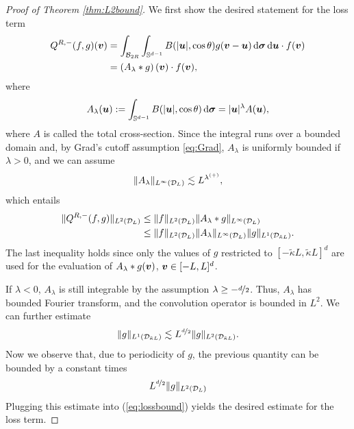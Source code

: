 \begin{proof}[Proof of Theorem \ref{thm:L2bound}]
    We first show the desired statement for the loss term
    \begin{align*}
        Q^{R,-}(f,g)({\bm v}) 
        &= \int_{\mathcal{B}_{2R}}\int_{\mathbb{S}^{d-1}}B(|{\bm u}|,\cos\theta)
            g({\bm v}-{\bm u})\,\mathrm{d}{\bm\sigma}\,\mathrm{d}{\bm u}\cdot f({\bm v}) \\
        &= \left(A_\lambda\ast g\right)({\bm v})\cdot f({\bm v}),
    \end{align*}
    where
    \[
        A_\lambda({\bm u}) := \int_{\mathbb{S}^{d-1}} B(|{\bm u}|,\cos\theta) \,\mathrm{d}{\bm\sigma} = |{\bm u}|^\lambda A({\bm u}),
    \]
    where $A$ is called the total cross-section.  Since the integral runs over a bounded domain and, by Grad's
    cutoff assumption \eqref{eq:Grad}, $A_\lambda$ is uniformly bounded if $\lambda>0$, and we can assume
    \[
        \|A_\lambda\|_{L^\infty(\mathcal{D}_L)} \lesssim L^{\lambda^{(+)}},
    \]
    which entails 
    \begin{align}
        \|Q^{R,-}(f,g)\|_{L^2(\mathcal{D}_L)} & \le \|f\|_{L^2(\mathcal{D}_L)}
                \|A_\lambda\ast g\|_{L^\infty(\mathcal{D}_L)} \\
        \label{eq:lossbound} & \le \|f\|_{L^2(\mathcal{D}_L)}
                \|A_\lambda\|_{L^\infty(\mathcal{D}_L)}\|g\|_{L^1(\mathcal{D}_{\tilde{\kappa}L})}.
    \end{align}
    The last inequality holds since only the values of $g$ restricted to
    $[-\tilde{\kappa}L,\tilde{\kappa}L]^d$ are used for the evaluation of $A_\lambda\ast g({\bm v})$, ${\bm v}\in
    [-L,L]^d$.

    If $\lambda<0$, $A_\lambda$ is still integrable by the assumption $\lambda\ge
    -\nicefrac{d}{2}$. Thus, $A_\lambda$ has bounded Fourier transform, and the
    convolution operator is bounded in $L^2$.  We can further estimate
    \[
        \|g\|_{L^1(\mathcal{D}_{\tilde{\kappa}L})}\lesssim 
        L^{\nicefrac{d}{2}}\|g\|_{L^2(\mathcal{D}_{\tilde{\kappa}L})}.
    \]
    Now we observe that, due to periodicity of $g$, the previous quantity can be bounded by a constant
    times
    \[
        L^{\nicefrac{d}{2}}\|g\|_{L^2(\mathcal{D}_L)}
    \]
    Plugging this estimate into (\ref{eq:lossbound}) yields the desired
    estimate for the loss term.


\end{proof}
